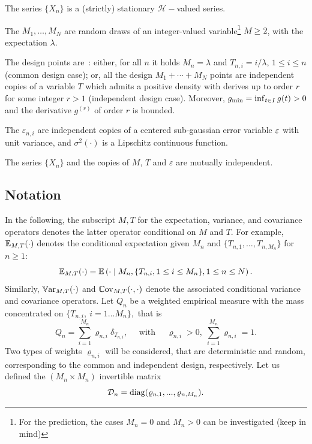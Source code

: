 \documentclass{article}
\begin{document}
\begin{assumptionH}
	\item   \label{H:model:stationarity} \!The series  $\{X_n\}$ is a (strictly) stationary $\mathcal H-$valued series.
	
	\item\label{H:model:Mn}  \!The $M_1,\dotsc,M_N$ are random  draws of an integer-valued variable\footnote{For the prediction, the cases $M_n=0$ and $M_n>0$ can be investigated (keep in mind)} $M\geq 2$, with the expectation $\lambda$. 
	
	\item\label{H:model:Tni}  The design points are~: either, for all $n$ it holds $M_n=\lambda$ and $T_{n,i}=i/\lambda$, $1\leq i \leq n$ (common design case); or, all the design $M_1+\cdots+M_N$ points are independent copies of a  variable $T$ which admits a positive density with derives up to order $r$ for some integer $r>1$  (independent design case). Moreover,  $g_{\rm min}=\inf_{t\in I} g(t) >0$ and the derivative $g^{(r)}$ of order $r$ is bounded. 
	
	\item\label{H:model:epsni} \!The $\varepsilon_{n,i} $  are independent copies of a centered sub-gaussian error variable ${\varepsilon}$ with   unit variance, and  $\sigma^2(\cdot)$ is a Lipschitz continuous function. 
	
	\item\label{H:model:ind} \!The series $\{X_n\}$ and the copies of  $M$, $T$ and $\varepsilon$ are mutually independent.
\end{assumptionH}




\subsection{Notation}

In the following, the subscript $M,T$ for the expectation, variance, and covariance operators denotes the latter operator conditional on $M$ and $T$. For example, $\mathbb{E}_{M,T}(\cdot)$ denotes the conditional expectation given $M_n$ and $\{T_{n,1}, \ldots, T_{n,M_n}\}$ for $n \geq 1$:
\begin{equation}
	\mathbb{E}_{M,T}(\cdot) = \mathbb{E} \left( \cdot \mid M_n, \{T_{n,i}, 1 \leq i \leq M_n\}, 1 \leq n \leq N \right).
\end{equation}
Similarly, $\operatorname{\mathbb{V}ar}_{M,T}(\cdot)$ and $\operatorname{\mathbb{C}ov}_{M,T}(\cdot,\cdot)$ denote the associated conditional variance and covariance operators.
Let $Q_n$ be a weighted empirical measure with the  mass concentrated on $\{T_{n,i},\ i=1\ldots M_n\},$ that is
\begin{equation}\label{def_Qn}
Q_n = \sum_{i=1}^{M_n}\varrho_{n,i} \delta_{T_{n,i}}, \quad \text{ with }\quad  \varrho_{n,i}>0,\;  \sum_{i=1}^{M_n} \varrho_{n,i} = 1.
\end{equation}
Two types of weights $\varrho_{n,i}$ will be considered, that are deterministic and random, corresponding to the common and independent design, respectively. Let us defined the $(M_n\times M_n)$ invertible matrix
$$
\mathcal{D}_n = \operatorname{diag} (\varrho_{n,1},...,\varrho_{n,M_n}).
$$
\end{document}
